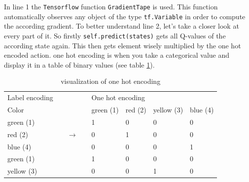 \documentclass[12pt]{article}
\begin{document}
In line 1 the \lstinline{Tensorflow} function \lstinline{GradientTape} is used. This function automatically observes any object of the type \lstinline{tf.Variable} in order to compute the according \gls{gradient}. \cite{tf.grad} To better understand line 2, let's take a closer look at every part of it. So firstly \lstinline{self.predict(states)} gets all \glspl{Q-value} of the according \gls{state} again. This then gets element wisely multiplied by the one hot encoded action. \Gls{one hot encoding} is when you take a categorical value and display it in a table of binary values (see table \ref{tab:oneHot}). 

\begin{centering}
\begin{table}[H]
\caption{visualization of \gls{one hot encoding}}
\label{tab:oneHot}
\begin{tabular}{lllllllll}
Label encoding               &  &  &  &                       & \multicolumn{4}{l}{One hot encoding}                                                              \\ \cline{1-1} \cline{6-9} 
\multicolumn{1}{|l|}{Color} &
   &
   &
   &
  \multicolumn{1}{l|}{} &
  \multicolumn{1}{l|}{green (1)} &
  \multicolumn{1}{l|}{red (2)} &
  \multicolumn{1}{l|}{yellow (3)} &
  \multicolumn{1}{l|}{blue (4)} \\ \cline{1-1} \cline{6-9} 
\multicolumn{1}{|l|}{green (1)}  &  &  &  & \multicolumn{1}{l|}{} & \multicolumn{1}{l|}{1} & \multicolumn{1}{l|}{0} & \multicolumn{1}{l|}{0} & \multicolumn{1}{l|}{0} \\ \cline{1-1} \cline{6-9} 
\multicolumn{1}{|l|}{red (2)} &
   &
  \multicolumn{2}{l}{$\rightarrow$} &
  \multicolumn{1}{l|}{} &
  \multicolumn{1}{l|}{0} &
  \multicolumn{1}{l|}{1} &
  \multicolumn{1}{l|}{0} &
  \multicolumn{1}{l|}{0} \\ \cline{1-1} \cline{6-9} 
\multicolumn{1}{|l|}{blue (4)}   &  &  &  & \multicolumn{1}{l|}{} & \multicolumn{1}{l|}{0} & \multicolumn{1}{l|}{0} & \multicolumn{1}{l|}{0} & \multicolumn{1}{l|}{1} \\ \cline{1-1} \cline{6-9} 
\multicolumn{1}{|l|}{green (1)}  &  &  &  & \multicolumn{1}{l|}{} & \multicolumn{1}{l|}{1} & \multicolumn{1}{l|}{0} & \multicolumn{1}{l|}{0} & \multicolumn{1}{l|}{0} \\ \cline{1-1} \cline{6-9} 
\multicolumn{1}{|l|}{yellow (3)} &  &  &  & \multicolumn{1}{l|}{} & \multicolumn{1}{l|}{0} & \multicolumn{1}{l|}{0}  & \multicolumn{1}{l|}{1} & \multicolumn{1}{l|}{0} \\ \cline{1-1} \cline{6-9} 
\end{tabular}
\end{table}
\end{centering}
\end{document}
